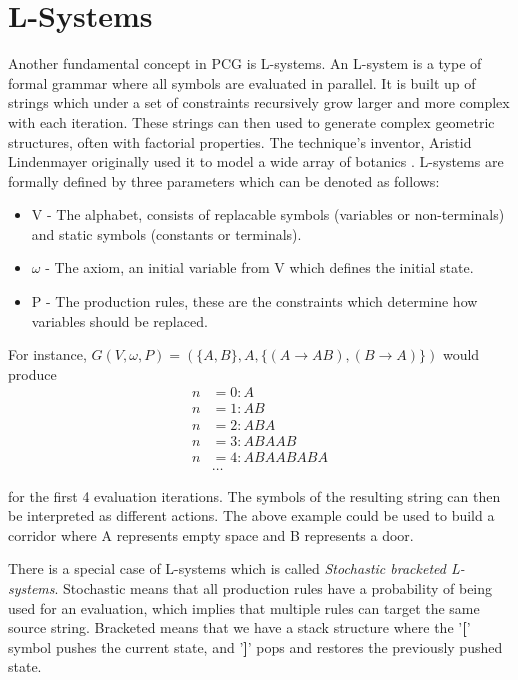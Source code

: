 \section{L-Systems}

Another fundamental concept in PCG is L-systems.
An L-system is a type of formal grammar where all symbols are evaluated in parallel.
It is built up of strings which under a set of constraints recursively grow larger and more complex with each iteration.
These strings can then used to generate complex geometric structures, often with factorial properties.
The technique's inventor, Aristid Lindenmayer originally used it to model a wide array of botanics \cite{lsystem_book}.
L-systems are formally defined by three parameters which can be denoted as follows:

\begin{itemize}
  \item V  - The alphabet, consists of replacable symbols (variables or non-terminals) and static symbols (constants or terminals).
  \item $\omega$ - The axiom, an initial variable from V which defines the initial state.
  \item P - The production rules, these are the constraints which determine how variables should be replaced.
\end{itemize}

For instance, $G(V, \omega, P) = (\{A, B\}, A, \{(A \to AB), (B \to A)\})$ would produce
\begin{align*}
  n &= 0: A \\
  n &= 1: AB \\
  n &= 2: ABA \\
  n &= 3: ABAAB \\
  n &= 4: ABAABABA \\
  &\dots
\end{align*}

for the first 4 evaluation iterations. The symbols of the resulting string can then be interpreted as different actions.
The above example could be used to build a corridor where A represents empty space and B represents a door.

There is a special case of L-systems which is called \textit{Stochastic bracketed L-systems}.
Stochastic means that all production rules have a probability of being used for an evaluation, which implies that multiple rules can target the same source string.
Bracketed means that we have a stack structure where the '\textbf{[}' symbol pushes the current state, and '\textbf{]}' pops and restores the previously pushed state.


